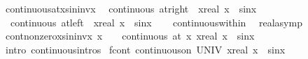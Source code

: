 \begin{isabellebody}
%
\isadelimproof
%
\endisadelimproof
\isanewline
\isanewline
{}\isamarkupfalse%
\ continuous{\isacharunderscore}{\kern0pt}at{\isacharunderscore}{\kern0pt}{}{\isacharunderscore}{\kern0pt}xsininvx{\isacharcolon}{\kern0pt}\isanewline
\ \ {\isachardoublequoteopen}continuous\ {\isacharparenleft}{\kern0pt}at{\isacharunderscore}{\kern0pt}right\ {}{\isacharparenright}{\kern0pt}\ {\isacharparenleft}{\kern0pt}{\isasymlambda}x{\isacharcolon}{\kern0pt}{\isacharcolon}{\kern0pt}real{\isachardot}{\kern0pt}\ x\ {\isacharasterisk}{\kern0pt}\ sin{\isacharparenleft}{\kern0pt}{}{\isacharslash}{\kern0pt}x{\isacharparenright}{\kern0pt}{\isacharparenright}{\kern0pt}{\isachardoublequoteclose}\isanewline
\ \ {\isachardoublequoteopen}continuous\ {\isacharparenleft}{\kern0pt}at{\isacharunderscore}{\kern0pt}left\ {}{\isacharparenright}{\kern0pt}\ {\isacharparenleft}{\kern0pt}{\isasymlambda}x{\isacharcolon}{\kern0pt}{\isacharcolon}{\kern0pt}real{\isachardot}{\kern0pt}\ x\ {\isacharasterisk}{\kern0pt}\ sin{\isacharparenleft}{\kern0pt}{}{\isacharslash}{\kern0pt}x{\isacharparenright}{\kern0pt}{\isacharparenright}{\kern0pt}{\isachardoublequoteclose}\isanewline
%
\isadelimproof
\ \ %
\endisadelimproof
%
\isatagproof
{}\isamarkupfalse%
\ continuous{\isacharunderscore}{\kern0pt}within\ \isamarkupfalse%
\ real{\isacharunderscore}{\kern0pt}asymp{\isacharplus}{\kern0pt}%
\endisatagproof
{\isafoldproof}%
%
\isadelimproof
\isanewline
%
\endisadelimproof
\isanewline
{}\isamarkupfalse%
\ cont{\isacharunderscore}{\kern0pt}nonzero{\isacharunderscore}{\kern0pt}xsininvx{\isacharcolon}{\kern0pt}\ {\isachardoublequoteopen}x\ {\isasymnoteq}\ {}\ {\isasymLongrightarrow}\ continuous\ {\isacharparenleft}{\kern0pt}at\ x{\isacharparenright}{\kern0pt}\ {\isacharparenleft}{\kern0pt}{\isasymlambda}x{\isacharcolon}{\kern0pt}{\isacharcolon}{\kern0pt}real{\isachardot}{\kern0pt}\ x\ {\isacharasterisk}{\kern0pt}\ sin{\isacharparenleft}{\kern0pt}{}{\isacharslash}{\kern0pt}x{\isacharparenright}{\kern0pt}{\isacharparenright}{\kern0pt}{\isachardoublequoteclose}\isanewline
%
\isadelimproof
\ \ %
\endisadelimproof
%
\isatagproof
{}\isamarkupfalse%
\ {\isacharparenleft}{\kern0pt}intro\ continuous{\isacharunderscore}{\kern0pt}intros{\isacharparenright}{\kern0pt}%
\endisatagproof
{\isafoldproof}%
%
\isadelimproof
\isanewline
%
\endisadelimproof
\isanewline
{}\isamarkupfalse%
\ f{\isacharunderscore}{\kern0pt}cont{\isacharcolon}{\kern0pt}\ {\isachardoublequoteopen}continuous{\isacharunderscore}{\kern0pt}on\ UNIV\ {\isacharparenleft}{\kern0pt}{\isasymlambda}x{\isacharcolon}{\kern0pt}{\isacharcolon}{\kern0pt}real{\isachardot}{\kern0pt}\ x\ {\isacharasterisk}{\kern0pt}\ sin{\isacharparenleft}{\kern0pt}{}{\isacharslash}{\kern0pt}x{\isacharparenright}{\kern0pt}{\isacharparenright}{\kern0pt}{\isachardoublequoteclose}\isanewline

\end{isabellebody}
